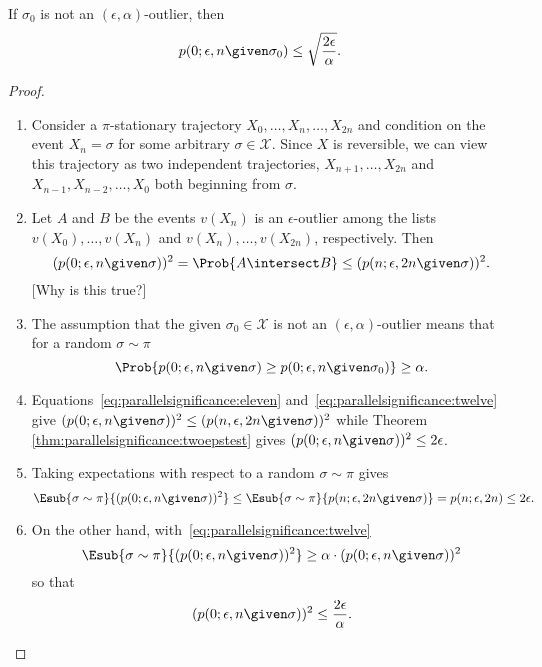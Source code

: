 \documentclass[12pt]{article}
\begin{document}
\begin{lemma}
    If \( \sigma_0 \) is not an \( (\epsilon,\alpha) \)-outlier, then
    \[
        \label{eq:parallelsignificance:nine} p(0; \epsilon, n \given
        \sigma_0) \le \sqrt{\frac{2 \epsilon}{\alpha}}.
    \]
\end{lemma}

\begin{proof}
  \begin{enumerate}
\item
    Consider a \( \pi \)-stationary trajectory \( X_0, \dots, X_n, \dots,
    X_{2n} \) and condition on the event \( X_n = \sigma \) for some
    arbitrary \( \sigma \in \mathcal{X} \).  Since \( X \) is
    reversible, we can view this trajectory as two independent
    trajectories, \( X_{n+1}, \dots, X_{2n} \) and \( X_{n-1}, X_ {n-2},
    \dots, X_0 \) both beginning from \( \sigma \).
\item
    Let \( A \) and \( B \) be the events \( v(X_n) \) is an \( \epsilon
    \)-outlier among the lists \( v(X_0), \dots, v(X_n) \) and \( v(X_n),
    \dots, v(X_{2n}) \), respectively. Then
    \begin{equation}
        \label{eq:parallelsignificance:eleven} (p(0; \epsilon, n \given
        \sigma))^2 = \Prob{ A \intersect B} \le (p(n; \epsilon, 2n
        \given \sigma))^2.
    \end{equation}
        [Why is this true?]
\item
    The assumption that the given \( \sigma_0 \in \mathcal{X} \) is not
    an \( (\epsilon, \alpha) \)-outlier means that for a random \(
    \sigma \sim \pi \)
    \begin{equation}
        \label{eq:parallelsignificance:twelve} \Prob{ p(0; \epsilon, n
        \given \sigma) \ge p(0; \epsilon, n \given \sigma_0) } \ge
        \alpha.
    \end{equation}
\item
    Equations~\eqref{eq:parallelsignificance:eleven} and~\eqref{eq:parallelsignificance:twelve}
    give \( (p(0; \epsilon, n \given \sigma))^2 \le (p(n, \epsilon, 2n
    \given \sigma))^2 \) while Theorem~%
    \ref{thm:parallelsignificance:twoepstest} gives \( (p(0; \epsilon, n
    \given \sigma))^2 \le 2\epsilon \).
\item
    Taking expectations with respect to a random \( \sigma \sim \pi \)
    gives
    \[
        \Esub{\sigma \sim \pi}{(p(0; \epsilon, n \given \sigma))^2 } \le
        \Esub{\sigma \sim \pi}{p(n; \epsilon, 2n \given \sigma) } = p(n;
        \epsilon, 2n) \le 2\epsilon.
    \]
\item
    On the other hand, with~\eqref{eq:parallelsignificance:twelve}
    \[
        \Esub{\sigma \sim \pi}{(p(0; \epsilon, n \given \sigma))^2 } \ge
        \alpha \cdot (p(0; \epsilon, n \given \sigma))^2
    \] so that
    \[
        (p(0; \epsilon, n \given \sigma))^2 \le \frac{2\epsilon} {\alpha}.
    \]
  \end{enumerate}
\end{proof}
\end{document}
